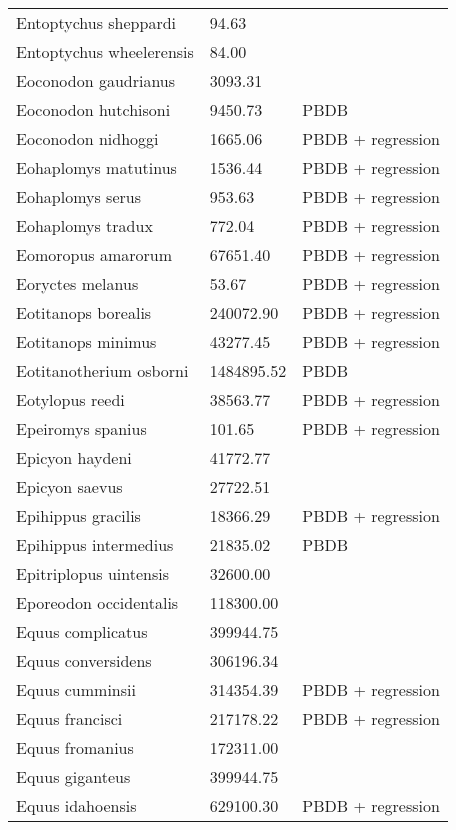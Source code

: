 \documentclass{article}
\begin{document}
\begin{center}
\begin{longtable}{p{} p{} p{} }
  Entoptychus sheppardi & 94.63 & \cite{Tomiya2013} \\ 
  Entoptychus wheelerensis & 84.00 & \cite{McKenna2011} \\ 
  Eoconodon gaudrianus & 3093.31 & \cite{Zonneveld2003} \\ 
  Eoconodon hutchisoni & 9450.73 & PBDB \\ 
  Eoconodon nidhoggi & 1665.06 & PBDB + regression \\ 
  Eohaplomys matutinus & 1536.44 & PBDB + regression \\ 
  Eohaplomys serus & 953.63 & PBDB + regression \\ 
  Eohaplomys tradux & 772.04 & PBDB + regression \\ 
  Eomoropus amarorum & 67651.40 & PBDB + regression \\ 
  Eoryctes melanus & 53.67 & PBDB + regression \\ 
  Eotitanops borealis & 240072.90 & PBDB + regression \\ 
  Eotitanops minimus & 43277.45 & PBDB + regression \\ 
  Eotitanotherium osborni & 1484895.52 & PBDB \\ 
  Eotylopus reedi & 38563.77 & PBDB + regression \\ 
  Epeiromys spanius & 101.65 & PBDB + regression \\ 
  Epicyon haydeni & 41772.77 & \cite{Tomiya2013} \\ 
  Epicyon saevus & 27722.51 & \cite{Tomiya2013} \\ 
  Epihippus gracilis & 18366.29 & PBDB + regression \\ 
  Epihippus intermedius & 21835.02 & PBDB \\ 
  Epitriplopus uintensis & 32600.00 & \cite{MacFadden1986} \\ 
  Eporeodon occidentalis & 118300.00 & \cite{McKenna2011} \\ 
  Equus complicatus & 399944.75 & \cite{Smith2004} \\ 
  Equus conversidens & 306196.34 & \cite{Smith2004} \\ 
  Equus cumminsii & 314354.39 & PBDB + regression \\ 
  Equus francisci & 217178.22 & PBDB + regression \\ 
  Equus fromanius & 172311.00 & \cite{McKenna2011} \\ 
  Equus giganteus & 399944.75 & \cite{Smith2004} \\ 
  Equus idahoensis & 629100.30 & PBDB + regression \\ 

\end{longtable}
\end{center}
\end{document}
